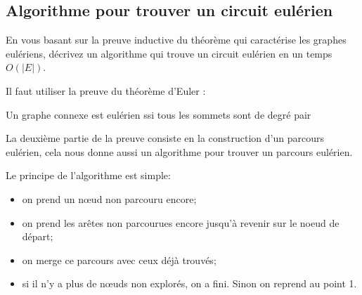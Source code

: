 \subsection{Algorithme pour trouver un circuit eulérien} En vous basant sur la preuve inductive du théorème qui caractérise les graphes eulériens, décrivez un algorithme qui trouve un circuit eulérien en un temps $O(|E|)$.
\begin{solution}
Il faut utiliser la preuve du théorème d'Euler :

\begin{center}
Un graphe connexe est eulérien ssi tous les sommets sont de degré
pair
\par\end{center}

La deuxième partie de la preuve consiste en la construction d'un parcours
eulérien, cela nous donne aussi un algorithme pour trouver un parcours
eulérien.

Le principe de l’algorithme est simple:
\begin{itemize}
\item on prend un nœud non parcouru encore;
\item on prend les arêtes non parcourues encore jusqu'à revenir sur le noeud de départ;
\item on merge ce parcours avec ceux déjà trouvés;
\item si il n'y a plus de nœuds non explorés, on a fini. Sinon on reprend au point 1.
\end{itemize}
\end{solution}

